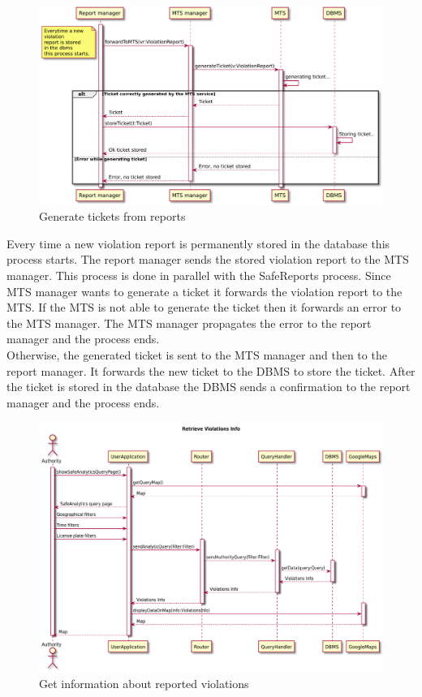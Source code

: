 \documentclass[./main.tex]{subfiles}
\begin{document}

\begin{figure}[H]
\centering
\includegraphics[width=\textwidth]{resources/sequence_diagrams/generate_tickets}
\caption{Generate tickets from reports}
\end{figure}

Every time a new violation report is permanently stored in the database this process starts.
The report manager sends the stored violation report to the MTS
manager. This process is done in parallel with the SafeReports process.
Since MTS manager wants to generate a ticket it forwards the violation
report to the MTS.
If the MTS is not able to generate the ticket then it forwards an error to the MTS manager. The MTS manager propagates the error to the report manager and the process ends.\\
Otherwise, the generated ticket is sent to the MTS manager and then to the report manager. It forwards the new ticket to the DBMS to store the ticket.
After the ticket is stored in the database the DBMS sends a confirmation to the report manager and the process ends.

\begin{figure}[H]
\centering
\includegraphics[width=\textwidth]{resources/sequence_diagrams/retrieve_violation_info}
\caption{Get information about reported violations}
\end{figure}
\end{document}
